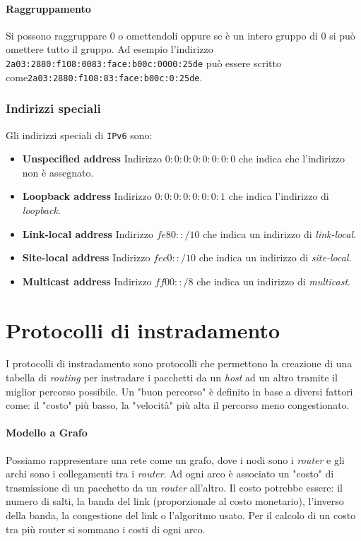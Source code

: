             \paragraph{Raggruppamento} Si possono raggruppare $0$ o omettendoli oppure se è un intero gruppo di $0$ si può omettere tutto il gruppo. Ad esempio l'indirizzo \texttt{2a03:2880:f108:0083:face:b00c:0000:25de} può essere scritto come\texttt{2a03:2880:f108:83:face:b00c:0:25de}. 
        \subsubsection{Indirizzi speciali}
            Gli indirizzi speciali di \texttt{IPv6} sono: \begin{itemize}
                \item \textbf{Unspecified address} Indirizzo $0:0:0:0:0:0:0:0$ che indica che l'indirizzo non è assegnato.
                \item \textbf{Loopback address} Indirizzo $0:0:0:0:0:0:0:1$ che indica l'indirizzo di \textit{loopback}.
                \item \textbf{Link-local address} Indirizzo $fe80::/10$ che indica un indirizzo di \textit{link-local}.
                \item \textbf{Site-local address} Indirizzo $fec0::/10$ che indica un indirizzo di \textit{site-local}.
                \item \textbf{Multicast address} Indirizzo $ff00::/8$ che indica un indirizzo di \textit{multicast}.
            \end{itemize}
\section{Protocolli di instradamento}
    I protocolli di instradamento sono protocolli che permettono la creazione di una tabella di \textit{routing} per instradare i pacchetti da un \textit{host} ad un altro tramite il miglior percorso possibile. Un "buon percorso" è definito in base a diversi fattori come: il "costo" più basso, la "velocità" più alta il percorso meno congestionato. 
    \paragraph{Modello a Grafo} Possiamo rappresentare una rete come un grafo, dove i nodi sono i \textit{router} e gli archi sono i collegamenti tra i \textit{router}. Ad ogni arco è associato un "costo" di trasmissione di un pacchetto da un \textit{router} all'altro. Il costo potrebbe essere: il numero di salti, la banda del link (proporzionale al costo monetario), l'inverso della banda, la congestione del link o l'algoritmo usato. Per il calcolo di un costo tra più router si sommano i costi di ogni arco.
